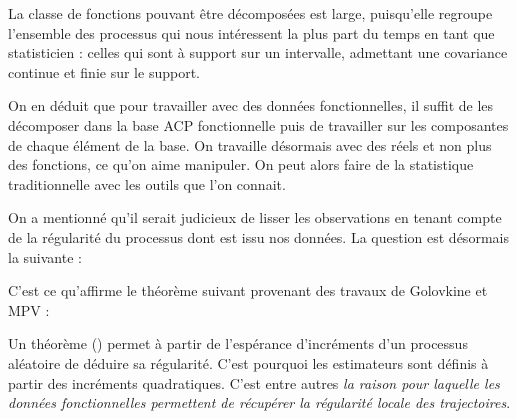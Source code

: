 \begin{rem}
	La classe de fonctions pouvant être décomposées est large, puisqu'elle regroupe l'ensemble des processus qui nous intéressent la plus part du temps en tant que statisticien : celles qui sont à support sur un intervalle, admettant une covariance continue et finie sur le support.
\end{rem}

On en déduit que pour travailler avec des données fonctionnelles, il suffit de les décomposer dans la base ACP fonctionnelle puis de travailler sur les composantes de chaque élément de la base. On travaille désormais avec des réels et non plus des fonctions, ce qu'on aime manipuler. On peut alors faire de la statistique traditionnelle avec les outils que l'on connait.


\begin{propriete*}
	\noindent{}
\end{propriete*}

On a mentionné qu'il serait judicieux de lisser les observations en tenant compte de la régularité du processus dont est issu nos données. La question est désormais la suivante :


C'est ce qu'affirme le théorème suivant provenant des travaux de Golovkine et MPV :

\begin{thm*}
	\noindent{}
	\label{thm*:regularite_locale}
\end{thm*}
\begin{rem}
	Un théorème () permet à partir de l'espérance d'incréments d'un processus aléatoire de déduire sa régularité.
	C'est pourquoi les estimateurs sont définis à partir des incréments quadratiques. C'est entre autres \emph{la raison pour laquelle les données fonctionnelles permettent de récupérer la régularité locale des trajectoires}.

	\label{rem:kolmo_continuite}
\end{rem}